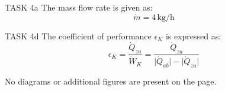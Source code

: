 TASK 4a  
The mass flow rate is given as:  
\[
\dot{m} = 4 \, \text{kg/h}
\]

TASK 4d  
The coefficient of performance \( \epsilon_K \) is expressed as:  
\[
\epsilon_K = \frac{\dot{Q}_{zu}}{\dot{W}_K} = \frac{\dot{Q}_{zu}}{\lvert \dot{Q}_{ab} \rvert - \lvert \dot{Q}_{zu} \rvert}
\]  

No diagrams or additional figures are present on the page.